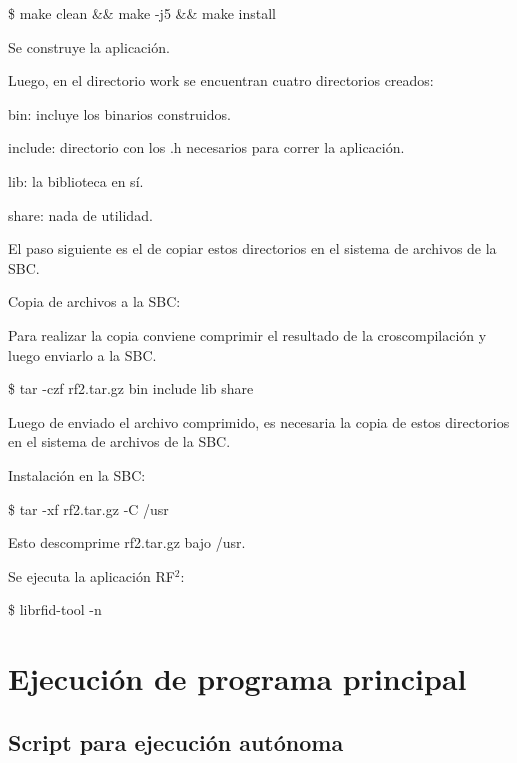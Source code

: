 \centerline{\$ make clean \&\& make -j5 \&\& make install}
Se construye la aplicación.

Luego, en el directorio work se encuentran cuatro directorios creados:

\bigskip
bin: incluye los binarios construidos.

include: directorio con los .h necesarios para correr la aplicación.

lib: la biblioteca en sí.

share: nada de utilidad.

\bigskip
El paso siguiente es el de copiar estos directorios en el sistema de archivos de la SBC.

\bigskip
Copia de archivos a la SBC:

\bigskip
Para realizar la copia conviene comprimir el resultado de la croscompilación y luego enviarlo a la SBC.

\centerline{\$ tar -czf rf2.tar.gz bin include lib share}

\bigskip
Luego de enviado el archivo comprimido, es necesaria la copia de estos directorios en el sistema de archivos de la SBC.

\bigskip
Instalación en la SBC:

\centerline{\$ tar -xf rf2.tar.gz -C /usr}
Esto descomprime rf2.tar.gz bajo /usr.

\bigskip
Se ejecuta la aplicación RF$^{2}$:

\centerline{\$ librfid-tool -n}


\section{Ejecución de programa principal}

\subsection{Script para ejecución autónoma}

